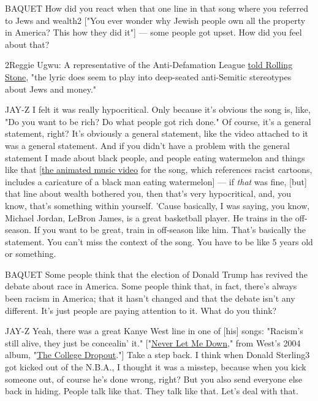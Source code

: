 BAQUET How did you react when that one line in that song where you
referred to Jews and wealth2 {[}"You ever wonder why Jewish people own
all the property in America? This how they did it"{]} --- some people
got upset. How did you feel about that?

2Reggie Ugwu: A representative of the Anti-Defamation League
\href{http://www.rollingstone.com/music/news/adl-rebukes-jay-z-over-jewish-lyric-in-the-story-of-oj-w491217}{told
Rolling Stone}, "the lyric does seem to play into deep-seated
anti-Semitic stereotypes about Jews and money."

JAY-Z I felt it was really hypocritical. Only because it's obvious the
song is, like, "Do you want to be rich? Do what people got rich done."
Of course, it's a general statement, right? It's obviously a general
statement, like the video attached to it was a general statement. And if
you didn't have a problem with the general statement I made about black
people, and people eating watermelon and things like that
{[}\href{https://www.youtube.com/watch?v=RM7lw0Ovzq0}{the animated music
video} for the song, which references racist cartoons, includes a
caricature of a black man eating watermelon{]} --- if \emph{that} was
fine, {[}but{]} that line about wealth bothered you, then that's very
hypocritical, and, you know, that's something within yourself. 'Cause
basically, I was saying, you know, Michael Jordan, LeBron James, is a
great basketball player. He trains in the off-season. If you want to be
great, train in off-season like him. That's basically the statement. You
can't miss the context of the song. You have to be like 5 years old or
something.

BAQUET Some people think that the election of Donald Trump has revived
the debate about race in America. Some people think that, in fact,
there's always been racism in America; that it hasn't changed and that
the debate isn't any different. It's just people are paying attention to
it. What do you think?

JAY-Z Yeah, there was a great Kanye West line in one of {[}his{]} songs:
"Racism's still alive, they just be concealin' it."
{[}"\href{https://open.spotify.com/track/06TqBu4Vi2DEu2F2wNTEnb}{Never
Let Me Down}," from West's 2004 album,
"\href{https://open.spotify.com/album/3ff2p3LnR6V7m6BinwhNaQ}{The
College Dropout}."{]} Take a step back. I think when Donald Sterling3
got kicked out of the N.B.A., I thought it was a misstep, because when
you kick someone out, of course he's done wrong, right? But you also
send everyone else back in hiding. People talk like that. They talk like
that. Let's deal with that.

